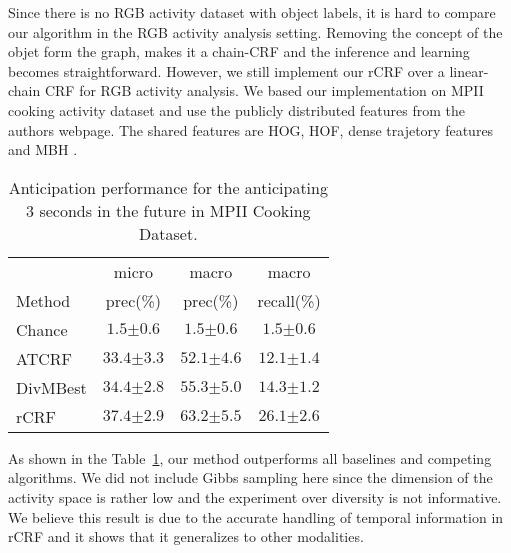 Since there is no RGB activity dataset with object labels, it is hard to compare our algorithm in the RGB activity analysis setting. Removing the concept of the objet form the graph, makes it a chain-CRF and the inference and learning becomes straightforward. However, we still implement our rCRF over a linear-chain CRF for RGB activity analysis. We based our implementation on MPII cooking activity dataset \cite{mpi_cooking} and use the publicly distributed features from the authors webpage. The shared features are HOG, HOF, dense trajetory features and  MBH \cite{dalal}.


\begin{table}
\centering
  \caption{Anticipation performance for the anticipating 3 seconds in the future in MPII Cooking Dataset\cite{mpi_cooking}.}
\begin{tabular}{l|ccc} \hline
& micro & macro & macro  \\
Method & prec(\%) & prec(\%) & recall(\%) \\ \hline
Chance & $1.5${\scriptsize $\pm 0.6$} & $1.5${\scriptsize $\pm 0.6$}  & $1.5${\scriptsize $\pm 0.6$}  \\
ATCRF \cite{hemaAnt} & $33.4${\scriptsize $\pm 3.3$} & $52.1${\scriptsize $\pm 4.6$}  & $12.1${\scriptsize $\pm 1.4$}  \\
DivMBest\cite{divmbest} & $34.4${\scriptsize $\pm 2.8$} & $55.3${\scriptsize $\pm 5.0$}  & $14.3${\scriptsize $\pm 1.2$}  \\
rCRF & $\mathbf{37.4}${\scriptsize $\mathbf{\pm 2.9}$} & $\mathbf{63.2}${\scriptsize $\mathbf{\pm 5.5}$}  & $\mathbf{26.1}${\scriptsize $\mathbf{\pm 2.6}$}  \\
\hline
\end{tabular}
\label{Tantmpi}
\end{table}

As shown in the Table~\ref{Tantmpi}, our method outperforms all baselines and competing algorithms. We did not include Gibbs sampling here since the dimension of the activity space is rather low and the experiment over diversity is not informative. We believe this result is due to the accurate handling of temporal information in rCRF and it shows that it generalizes to other modalities.
